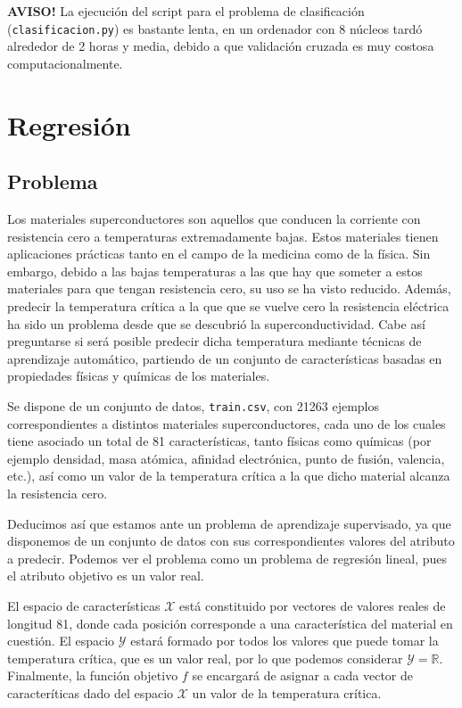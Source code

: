 \documentclass[a4]{article}
\begin{document}
\textbf{AVISO!} La ejecución del script para el problema de clasificación (\lstinline|clasificacion.py|) es bastante lenta, en un ordenador con 8 núcleos tardó alrededor de 2 horas y media, debido a que validación cruzada es muy costosa computacionalmente. 

\section{Regresión}


\subsection{Problema}

Los materiales superconductores son aquellos que conducen la corriente con resistencia cero a temperaturas extremadamente bajas. Estos materiales tienen aplicaciones prácticas tanto en el campo de la medicina como de la física. Sin embargo, debido a las bajas temperaturas a las que hay que someter a estos materiales para que tengan resistencia cero, su uso se ha visto reducido. Además, predecir la temperatura crítica a la que que se vuelve cero la resistencia eléctrica ha sido un problema desde que se descubrió la superconductividad. Cabe así preguntarse si será posible predecir dicha temperatura mediante técnicas de aprendizaje automático, partiendo de un conjunto de características basadas en propiedades físicas y químicas de los materiales.

Se dispone de un conjunto de datos, \lstinline|train.csv|, con 21263 ejemplos correspondientes a distintos materiales superconductores, cada uno de los cuales tiene asociado un total de 81 características, tanto físicas como químicas (por ejemplo densidad, masa atómica, afinidad electrónica, punto de fusión, valencia, etc.), así como un valor de la temperatura crítica a la que dicho material alcanza la resistencia cero. 

Deducimos así que estamos ante un problema de aprendizaje supervisado, ya que disponemos de un conjunto de datos con sus correspondientes valores del atributo a predecir. Podemos ver el problema como un problema de regresión lineal, pues el atributo objetivo es un valor real. 

El espacio de características $\mathcal{X}$ está constituido por vectores de valores reales de longitud 81, donde cada posición corresponde a una característica del material en cuestión. El espacio $\mathcal{Y}$
estará formado por todos los valores que puede tomar la temperatura crítica, que es un valor real, por lo que podemos considerar $\mathcal{Y}=\mathbb{R}$. Finalmente, la función objetivo $f$ se encargará de asignar a cada vector de caracteríticas dado del espacio $\mathcal{X}$ un valor de la temperatura crítica. 
\end{document}
